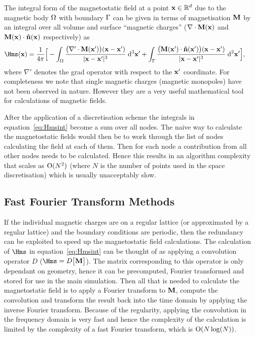 The integral form of the magnetostatic field at a point $\mathbf{x} \in \mathbb{R}^d$ due to the magnetic body $\Omega$ with boundary ${\Gamma}$ can be given in terms of magnetisation $\mathbf{M}$ by an integral over all volume and surface ``magnetic charges'' ($\nabla \cdot \mathbf{M}(\mathbf{x})$ and $\mathbf{M}(\mathbf{x}) \cdot \mathbf{\hat{n}}(\mathbf{x})$ respectively) as
\begin{align}
  \Hms(\xv) &= \frac{1}{4 \pi} \Big[ - \int_\magd \frac{\big( \nabla' \cdot \Mv(\xv') \big)(\xv - \xv')}{\abs{ \xv -\xv'}^3} \d^3 \xv'
  + \int_\boundd \frac{ \big( \Mv(\xv') \cdot \nv(\xv') \big) (\xv - \xv')}{\abs{\xv - \xv'}^3} \d^2 \xv' \Big],
  \label{eq:Hmsint}
\end{align}
where $\nabla'$ denotes the grad operator with respect to the $\mathbf{x}'$ coordinate. For completeness we note that single magnetic charges (magnetic monopoles) have not been observed in nature. However they are a very useful mathematical tool for calculations of magnetic fields.


After the application of a discretisation scheme the integrals in equation~\eqref{eq:Hmsint} become a sum over all nodes. The naive way to calculate the magnetostatic fields would then be to work through the list of nodes calculating the field at each of them. Then for each node a contribution from all other nodes needs to be calculated. Hence this results in an algorithm complexity that scales as $\text{O}(N^2)$ (where $N$ is the number of points used in the space discretisation) which is usually unacceptably slow.

\subsection{Fast Fourier Transform Methods}

If the individual magnetic charges are on a regular lattice (or approximated by a regular lattice) and the boundary conditions are periodic, then the redundancy can be exploited to speed up the magnetostatic field calculations. The calculation of $\Hms$ in equation~\eqref{eq:Hmsint} can be thought of as applying a convolution operator $D$ (\ie $\Hms = D \big[\Mv\big]$). The matrix corresponding to this operator  is only dependant on geometry, hence it can be precomputed, Fourier transformed and stored for use in the main simulation. Then all that is needed to calculate the magnetostatic field is to apply a Fourier transform to $\mathbf{M}$, compute the convolution and transform the result back into the time domain by applying the inverse Fourier transform. Because of the regularity, applying the convolution in the frequency domain is very fast and hence the complexity of the calculation is limited by the complexity of a fast Fourier transform, which is $\text{O}(N \log(N))$.\cite{Jones1997}

